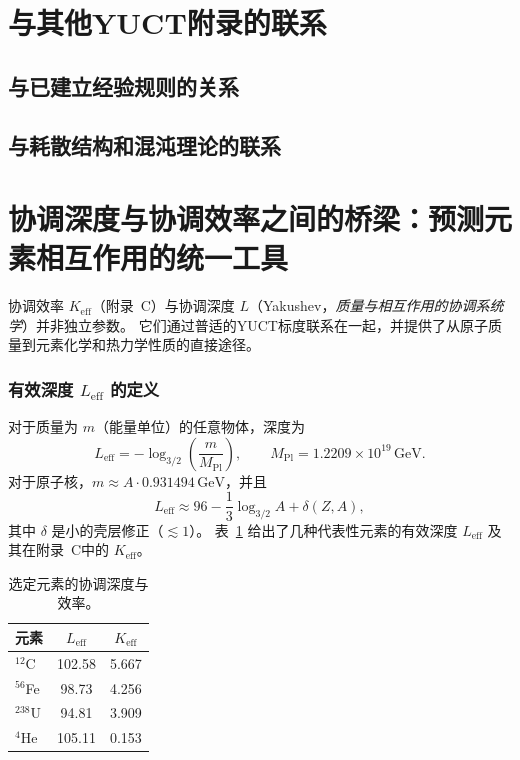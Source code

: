 \documentclass[11pt,a4paper]{article}
\begin{document}
	\endgroup
	
	\section{与其他YUCT附录的联系}
	\subsection{与已建立经验规则的关系}
	\subsection{与耗散结构和混沌理论的联系}
	
	\section{协调深度与协调效率之间的桥梁：预测元素相互作用的统一工具}
	\label{subsec:bridge}
	
	协调效率 \(K_{\mathrm{eff}}\)（附录~C）与协调深度 \(L\)（Yakushev，\textit{质量与相互作用的协调系统学}\cite{YKmass}）并非独立参数。  
	它们通过普适的YUCT标度联系在一起，并提供了从原子质量到元素化学和热力学性质的直接途径。
	
	\subsubsection{有效深度 \(L_{\mathrm{eff}}\) 的定义}
	对于质量为 \(m\)（能量单位）的任意物体，深度为
	\begin{equation}
		L_{\mathrm{eff}} = -\log_{3/2}\!\left(\frac{m}{M_{\mathrm{Pl}}}\right),
		\qquad M_{\mathrm{Pl}} = 1.2209\times10^{19}\,\text{GeV}.
	\end{equation}
	对于原子核，\(m \approx A \cdot 0.931494\,\text{GeV}\)，并且
	\begin{equation}
		L_{\mathrm{eff}} \approx 96 - \frac{1}{3}\log_{3/2}A + \delta(Z,A),
	\end{equation}
	其中 \(\delta\) 是小的壳层修正（\(\lesssim 1\)）。  
	表~\ref{tab:L_Keff} 给出了几种代表性元素的有效深度 \(L_{\mathrm{eff}}\) 及其在附录~C中的 \(K_{\mathrm{eff}}\)。
	
	\begin{table}[htbp]
		\centering
		\caption{选定元素的协调深度与效率。}
		\label{tab:L_Keff}
		\begin{tabular}{@{}lcc@{}}
			\toprule
			元素 & \(L_{\mathrm{eff}}\) & \(K_{\mathrm{eff}}\) \\
			\midrule
			$^{12}$C & 102.58 & 5.667 \\
			$^{56}$Fe & 98.73 & 4.256 \\
			$^{238}$U & 94.81 & 3.909 \\
			$^{4}$He & 105.11 & 0.153 \\
			\bottomrule
		\end{tabular}
	\end{table}
	
\end{document}
